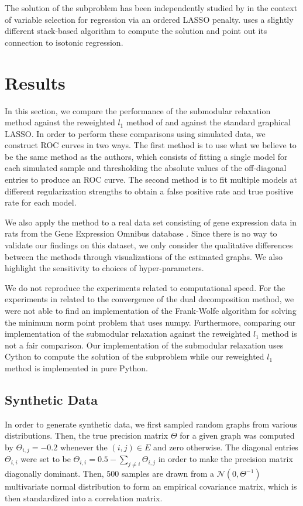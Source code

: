 \documentclass{uwstat572}
\theoremstyle{remark}
\theoremstyle{definition}
\begin{document}
The solution of the subproblem has been independently studied by \cite{bogdan2015slope} in the context of variable selection for regression via an ordered LASSO penalty.  \cite{bogdan2015slope} uses a slightly different stack-based algorithm to compute the solution and point out its connection to isotonic regression.


\section{Results}

In this section, we compare the performance of the submodular relaxation method against the reweighted $l_1$ method of \cite{liu11c} and against the standard graphical LASSO.  In order to perform these comparisons using simulated data, we construct ROC curves in two ways.  The first method is to use what we believe to be the same method as the authors, which consists of fitting a single model for each simulated sample and thresholding the absolute values of the off-diagonal entries to produce an ROC curve.  The second method is to fit multiple models at different regularization strengths to obtain a false positive rate and true positive rate for each model.

We also apply the method to a real data set consisting of gene expression data in rats from the Gene Expression Omnibus database \citep{gds}.  Since there is no way to validate our findings on this dataset, we only consider the qualitative differences between the methods through visualizations of the estimated graphs. We also highlight the sensitivity to choices of hyper-parameters.

We do not reproduce the experiments related to computational speed.  For the experiments in \cite{Defazio2012} related to the convergence of the dual decomposition method, we were not able to find an implementation of the Frank-Wolfe algorithm for solving the minimum norm point problem that uses numpy.  Furthermore, comparing our implementation of the submodular relaxation against the reweighted $l_1$ method is not a fair comparison.  Our implementation of the submodular relaxation uses Cython to compute the solution of the subproblem while our reweighted $l_1$ method is implemented in pure Python. 

\subsection{Synthetic Data}

In order to generate synthetic data, we first sampled random graphs from various distributions.  Then, the true precision matrix $\Theta$ for a given graph was computed by $\Theta_{i,j} = -0.2$ whenever the $(i,j) \in E$ and zero otherwise.  The diagonal entries $\Theta_{i,i}$ were set to be $\Theta_{i,i} = 0.5 - \sum_{j \neq i} \Theta_{i,j}$ in order to make the precision matrix diagonally dominant.  Then, 500 samples are drawn from a  $\mathcal{N}(0,\Theta^{-1})$ multivariate normal distribution to form an empirical covariance matrix, which is then standardized into a correlation matrix.
\end{document}
